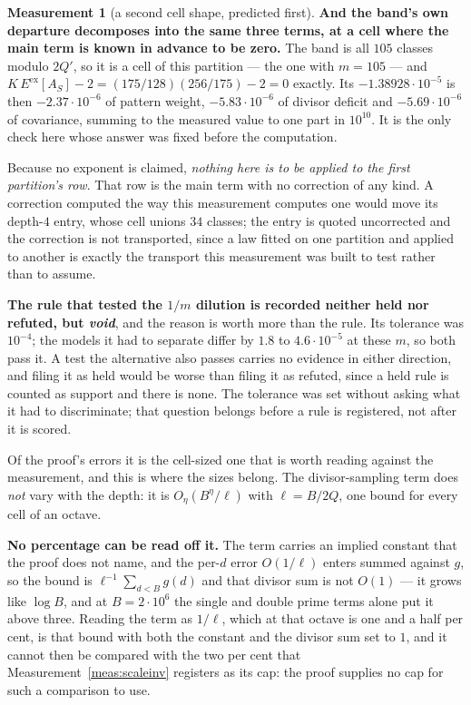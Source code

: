 \documentclass[11pt,a4paper]{article}
\theoremstyle{plain}
\theoremstyle{definition}
\newtheorem{measurement}[theorem]{Measurement}
\theoremstyle{remark}
\begin{document}
\begin{measurement}[a second cell shape, predicted first]
\textbf{And the band's own departure decomposes into the same three
terms, at a cell where the main term is known in advance to be zero.}
The band is all $105$ classes modulo $2Q'$, so it is a cell of this
partition --- the one with $m=105$ --- and
$K\,E^{\mathrm{ex}}[A_S]-2=(175/128)(256/175)-2=0$ exactly. Its
$-1.38928\cdot10^{-5}$ is then $-2.37\cdot10^{-6}$ of pattern weight,
$-5.83\cdot10^{-6}$ of divisor deficit and $-5.69\cdot10^{-6}$ of
covariance, summing to the measured value to one part in $10^{10}$.
It is the only check here whose answer was fixed before the
computation.

Because no exponent is claimed, \emph{nothing here is to be applied to
the first partition's row}. That row is the main term with no
correction of any kind. A correction computed the way this measurement
computes one would move its depth-$4$ entry, whose cell unions
$34$ classes; the entry is quoted uncorrected and the correction is not
transported, since a law fitted on one partition and applied to another
is exactly the transport this measurement was built to test rather than
to assume.

\textbf{The rule that tested the $1/m$ dilution is recorded neither
held nor refuted, but \emph{void}}, and the reason is worth more than
the rule. Its tolerance was $10^{-4}$; the models it had to separate
differ by $1.8$ to $4.6\cdot10^{-5}$ at these $m$, so both pass it. A
test the alternative also passes carries no evidence in either
direction, and filing it as held would be worse than filing it as
refuted, since a held rule is counted as support and there is none. The
tolerance was set without asking what it had to discriminate; that
question belongs before a rule is registered, not after it is scored.
\end{measurement}

Of the proof's errors it is the cell-sized one that is worth reading
against the measurement, and this is where the sizes belong. The
divisor-sampling term does \emph{not} vary with the depth: it is
$O_\eta(B^{\eta}/\ell)$ with $\ell=B/2Q$, one bound for every cell of
an octave.

\textbf{No percentage can be read off it.} The term carries an implied
constant that the proof does not name, and the per-$d$ error $O(1/\ell)$
enters summed against $g$, so the bound is $\ell^{-1}\sum_{d<B}g(d)$
and that divisor sum is not $O(1)$ --- it grows like $\log B$, and at
$B=2\cdot10^6$ the single and double prime terms alone put it above
three. Reading the term as $1/\ell$, which at that octave is one and a
half per cent, is that bound with both the constant and the divisor
sum set to $1$, and it cannot then be compared with the two per cent
that Measurement~\ref{meas:scaleinv} registers as its cap: the proof
supplies no cap for such a comparison to use.
\end{document}
